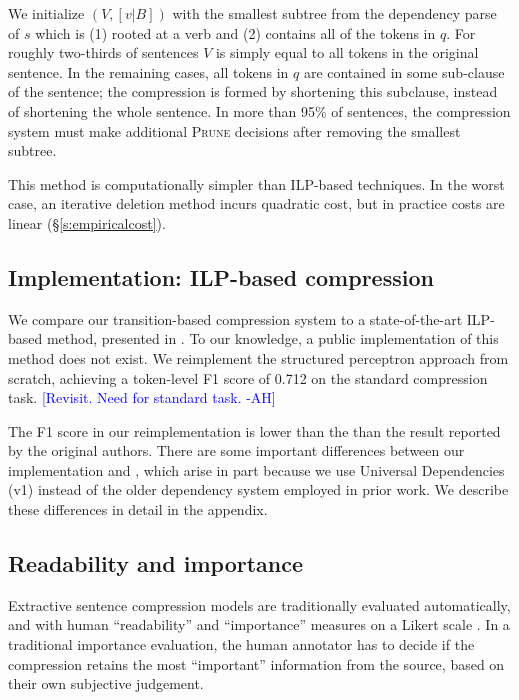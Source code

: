 \documentclass[11pt,a4paper]{article}
\newcommand{\ahcomment}[1]{\textcolor{blue}{[#1 -AH]}}
\begin{document}
We initialize $(V, [v|B])$ with the smallest subtree from the dependency parse of $s$ which is (1) rooted at a verb and (2) contains all of the tokens in $q$. For roughly two-thirds of sentences $V$ is simply equal to all tokens in the original sentence. In the remaining cases, all tokens in $q$ are contained in some sub-clause of the sentence; the compression is formed by shortening this subclause, instead of shortening the whole sentence. In more than 95\% of sentences, the compression system must make additional \textsc{Prune} decisions after removing the smallest subtree.

This method is computationally simpler than ILP-based techniques. In the worst case, an iterative deletion method incurs quadratic cost, but in practice costs are linear (\S\ref{s:empiricalcost}).

\subsection{Implementation: ILP-based compression}\label{s:ilp}

We compare our transition-based compression system to a state-of-the-art ILP-based method, presented in \citet{filippova2013overcoming}. To our knowledge, a public implementation of this method does not exist. We reimplement the structured perceptron approach from scratch, achieving a token-level F1 score of  0.712 on the standard compression task. \ahcomment{Revisit. Need for standard task.}

The F1 score in our reimplementation is lower than the than the result reported by the original authors. There are some important differences between our implementation and \citet{filippova2013overcoming}, which arise in part because we use Universal Dependencies (v1) instead of the older dependency system employed in prior work. We describe these differences in detail in the appendix.

\subsection{Readability and importance}\label{s:readabilityinformativeness}

Extractive sentence compression models are traditionally evaluated automatically, and with human ``readability'' and ``importance'' measures on a Likert scale \cite{Knight2000StatisticsBasedS,filippova2015sentence}. In a traditional importance evaluation, the human annotator has to decide if the compression retains the most ``important'' information from the source, based on their own subjective judgement. 
\end{document}

